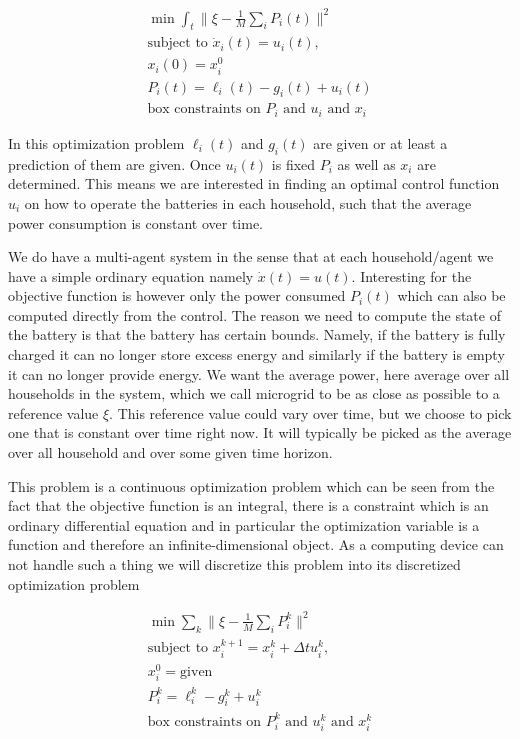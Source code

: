 \begin{align}
\min \int_t\|\xi-\frac{1}{M}\sum_i P_i(t)\|^2\\
\mbox{subject to } \dot{x}_i(t)=u_i(t), \\ 
x_i(0)=x_i^0\\
P_i(t)=\ell_i(t)-g_i(t)+u_i(t)\\
\mbox{box constraints on $P_i$ and $u_i$ and $x_i$}
\end{align}

In this optimization problem $\ell_i(t)$ and $g_i(t)$ are given or at least a prediction of them are given. Once $u_i(t)$ is fixed $P_i$ as well as $x_i$ are determined. This means we are interested in finding an optimal control function $u_i$ on how to operate the batteries in each household, such that the average power consumption is constant over time. 

We do have a multi-agent system in the sense that at each household/agent we have a simple ordinary equation namely $\dot{x}(t)=u(t)$. Interesting for the objective function is however only the power consumed $P_i(t)$ which can also be computed directly from the control. The reason we need to compute the state of the battery is that the battery has certain bounds. Namely, if the battery is fully charged it can no longer store excess energy and similarly if the battery is empty it can no longer provide energy. We want the average power, here average over all households in the system, which we call microgrid to be as close as possible to a reference value $\xi$. This reference value could vary over time, but we choose to pick one that is constant over time right now. It will typically be picked as the average over all household and over some given time horizon. 

This problem is a continuous optimization problem which can be seen from the fact that the objective function is an integral, there is a constraint which is an ordinary differential equation and in particular the optimization variable is a function and therefore an infinite-dimensional object. As a computing device can not handle such a thing we will discretize this problem into its discretized optimization problem

\begin{align}
\min \sum_k \|\xi-\frac{1}{M}\sum_i P^k_i\|^2\\
\mbox{subject to } x_i^{k+1}=x_i^k+\Delta t u^k_i, \\ 
x_i^0=\mbox{given}\\
P^k_i=\ell^k_i-g^k_i+u^k_i\\
\mbox{box constraints on $P^k_i$ and $u^k_i$ and $x^k_i$}
\end{align}

